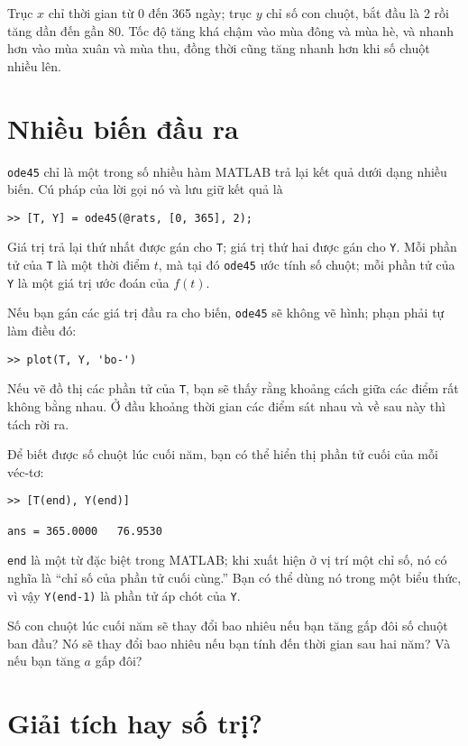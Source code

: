 \documentclass[12pt]{book}
\begin{document}
Trục $x$ chỉ thời gian từ 0 đến 365 ngày; trục $y$ chỉ số con chuột,
bắt đầu là 2 rồi tăng dần đến gần 80. Tốc độ tăng khá chậm vào 
mùa đông và mùa hè, và nhanh hơn vào mùa xuân và mùa thu,
đồng thời cũng tăng nhanh hơn khi số chuột nhiều lên.


\section{Nhiều biến đầu ra}
\label{rats}

{\tt ode45} chỉ là một trong số nhiều hàm MATLAB trả lại kết quả
dưới dạng nhiều biến. Cú pháp của lời gọi nó và lưu giữ kết quả là

\begin{verbatim}
>> [T, Y] = ode45(@rats, [0, 365], 2);
\end{verbatim}
%
Giá trị trả lại thứ nhất được gán cho {\tt T}; giá trị thứ hai được gán
cho {\tt Y}.  Mỗi phần tử của {\tt T} là một thời điểm $t$, mà 
tại đó {\tt ode45} ước tính số chuột; mỗi phần tử của {\tt Y} 
là một giá trị ước đoán của $f(t)$.

Nếu bạn gán các giá trị đầu ra cho biến, {\tt ode45} sẽ không 
vẽ hình; phạn phải tự làm điều đó:

\begin{verbatim}
>> plot(T, Y, 'bo-')
\end{verbatim}
%
Nếu vẽ đồ thị các phần tử của {\tt T}, bạn sẽ thấy rằng khoảng cách
giữa các điểm rất không bằng nhau. Ở đầu khoảng thời gian các điểm
sát nhau và về sau này thì tách rời ra.

Để biết được số chuột lúc cuối năm, bạn có thể hiển thị phần tử cuối
của mỗi véc-tơ:

\begin{verbatim}
>> [T(end), Y(end)]

ans = 365.0000   76.9530
\end{verbatim}
%
{\tt end} là một từ đặc biệt trong MATLAB; khi xuất hiện ở vị trí
một chỉ số, nó có nghĩa là ``chỉ số của phần tử cuối cùng.''  Bạn
có thể dùng nó trong một biểu thức, vì vậy {\tt Y(end-1)} là 
phần tử áp chót của {\tt Y}.

Số con chuột lúc cuối năm sẽ thay đổi bao nhiêu nếu bạn tăng
gấp đôi số chuột ban đầu? Nó sẽ thay đổi bao nhiêu nếu bạn 
tính đến thời gian sau hai năm? Và nếu bạn tăng $a$ gấp đôi?


\section{Giải tích hay số trị?}
\end{document}
